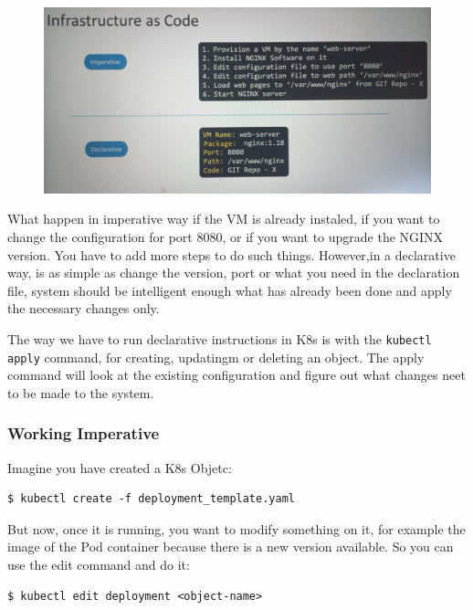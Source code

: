 \documentclass{article}
\newenvironment{codetemplate}[1][]{%
  \mybasecolorbox[#1]
  \itshape
}{%
  \endmybasecolorbox
}
\begin{document}
\begin{figure}[H]
    \centering
    \includegraphics[width=\textwidth]{pictures/impdec.jpeg}
\end{figure}

What happen in imperative way if the VM is already instaled, if you want to change the configuration for port 8080, or if you want to upgrade the NGINX version. You have to add more steps to do such things. However,in a declarative way, is as simple as change the version, port or what you need in the declaration file, system should be intelligent enough what has already been done and apply the necessary changes only.

The way we have to run declarative instructions in K8s is with the \verb|kubectl apply| command, for creating, updatingm or deleting an object. The apply command will look at the existing configuration and figure out what changes neet to be made to the system.

\subsubsection{Working Imperative}

Imagine you have created a K8s Objetc:

\begin{codetemplate}{}
\begin{verbatim}
$ kubectl create -f deployment_template.yaml
\end{verbatim}
\end{codetemplate}

But now, once it is running, you want to modify something on it, for example the image of the Pod container because there is a new version available. So you can use the edit command and do it:

\begin{codetemplate}{}
\begin{verbatim}
$ kubectl edit deployment <object-name>
\end{verbatim}
\end{codetemplate}
\end{document}
